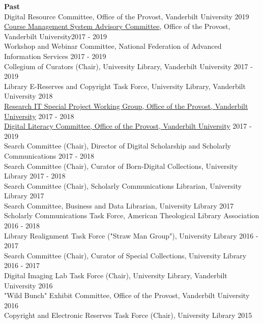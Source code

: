 \documentclass[10pt]{res} %
\begin{document}
\begin{resume}
{\bf Past} \\
Digital Resource Committee, Office of the Provost, Vanderbilt University \hfill 2019\\
\href{https://www.vanderbilt.edu/provost/committees/blackboard.php}{Course Management System Advisory Committee}, Office of the Provost, Vanderbilt University\hfill 2017 - 2019\\
Workshop and Webinar Committee, National Federation of Advanced Information Services \hfill 2017 - 2019\\
Collegium of Curators (Chair), University Library, Vanderbilt University  \hfill 2017 - 2019\\
Library E-Reserves and Copyright Task Force, University Library, Vanderbilt University \hfill 2018 \\
\href{https://news.vanderbilt.edu/2017/03/17/new-working-group-to-assess-and-prioritize-opportunities-for-enhancing-research-it-resources-on-campus/}{Research IT Special Project Working Group, Office of the Provost, Vanderbilt University} \hfill 2017 - 2018 \\
\href{https://www.vanderbilt.edu/ed-tech/committees/digital-literacy-committee.php}{Digital Literacy Committee, Office of the Provost, Vanderbilt University} \hfill 2017 - 2019\\
Search Committee (Chair), Director of Digital Scholarship and Scholarly Communications \hfill 2017 - 2018 \\
Search Committee (Chair), Curator of Born-Digital Collections, University Library \hfill 2017 - 2018 \\
Search Committee (Chair), Scholarly Communications Librarian, University Library \hfill 2017 \\
Search Committee, Business and Data Librarian, University Library \hfill 2017 \\
Scholarly Communications Task Force, American Theological Library Association \hfill 2016 - 2018 \\
Library Realignment Task Force ("Straw Man Group"), University Library \hfill 2016 - 2017 \\
Search Committee (Chair), Curator of Special Collections, University Library \hfill 2016 - 2017 \\
Digital Imaging Lab Task Force (Chair), University Library, Vanderbilt University \hfill 2016 \\
"Wild Bunch" Exhibit Committee, Office of the Provost, Vanderbilt University \hfill 2016 \\
Copyright and Electronic Reserves Task Force (Chair), University Library \hfill 2015 \\

\end{resume}
\end{document}
